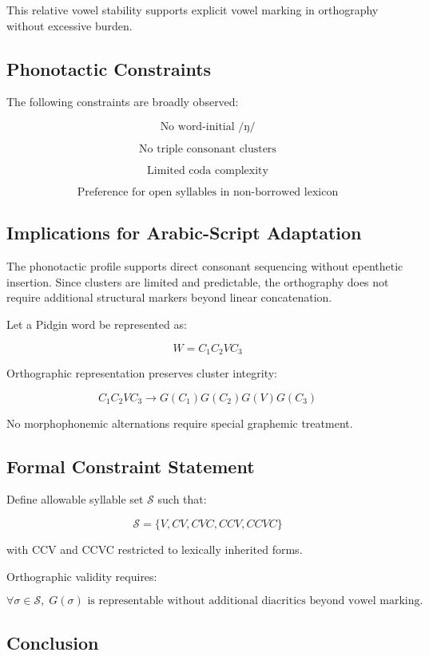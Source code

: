 \documentclass[12pt]{article}
\begin{document}
This relative vowel stability supports explicit vowel marking in orthography without excessive burden.

\subsection{Phonotactic Constraints}

The following constraints are broadly observed:

\[
\text{No word-initial } /ŋ/
\]

\[
\text{No triple consonant clusters}
\]

\[
\text{Limited coda complexity}
\]

\[
\text{Preference for open syllables in non-borrowed lexicon}
\]

\subsection{Implications for Arabic-Script Adaptation}

The phonotactic profile supports direct consonant sequencing without epenthetic insertion. Since clusters are limited and predictable, the orthography does not require additional structural markers beyond linear concatenation.

Let a Pidgin word be represented as:

\[
W = C_1 C_2 V C_3
\]

Orthographic representation preserves cluster integrity:

\[
C_1 C_2 V C_3 \rightarrow G(C_1)G(C_2)G(V)G(C_3)
\]

No morphophonemic alternations require special graphemic treatment.

\subsection{Formal Constraint Statement}

Define allowable syllable set \( \mathcal{S} \) such that:

\[
\mathcal{S} = \{ V, CV, CVC, CCV, CCVC \}
\]

with CCV and CCVC restricted to lexically inherited forms.

Orthographic validity requires:

\[
\forall \sigma \in \mathcal{S}, \; G(\sigma) \text{ is representable without additional diacritics beyond vowel marking.}
\]

\subsection{Conclusion}
\end{document}
